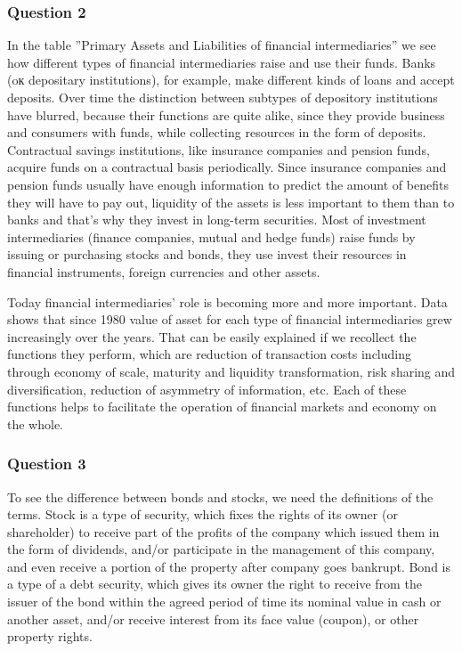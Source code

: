 \documentclass[a4paper,12pt]{article} %
\begin{document}
\subsubsection*{Question 2  }
In the table  ''Primary Assets and Liabilities of financial intermediaries''  we see how different types of financial intermediaries raise and use   their funds. Banks (oк depositary institutions), for example, make different kinds of loans and accept deposits. Over time the distinction between subtypes of depository institutions have blurred, because their functions are quite alike, since they provide business and consumers with funds, while collecting resources in the form of deposits.  Contractual savings institutions, like insurance companies and pension funds, acquire funds on a contractual basis periodically. Since insurance companies and pension funds  usually have enough information to predict the amount of benefits they will have to pay out, liquidity of the assets is less important to them than to banks and that's why they invest in long-term securities.  Most of investment intermediaries (finance companies, mutual and hedge funds) raise funds by issuing or purchasing  stocks and bonds, they use invest their resources in financial instruments, foreign currencies and other assets.   

 Today financial intermediaries' role is becoming  more and more important. Data shows that since 1980 value of asset for each type of financial intermediaries grew increasingly   over the  years. That can be easily explained if we recollect the functions they perform, which are  reduction of transaction costs including through economy of scale,  maturity and liquidity transformation, risk sharing and diversification, reduction of asymmetry of information, etc. Each of these functions helps to facilitate the operation of financial markets and economy on the whole. 

\subsubsection*{Question 3  }
To see the difference between bonds and stocks, we need the definitions of the terms. 
Stock is a type of security, which fixes  the rights of its owner (or shareholder) to receive part of the profits of the  company which issued them  in the form of dividends, and/or participate in the management of this company, and even  receive a portion of the property  after company  goes bankrupt.
Bond is a type of a debt security, which gives its owner the right to receive from the issuer of the bond  within the agreed period of time its nominal value in cash or  another asset, and/or receive interest  from its face value (coupon), or other property rights.
\end{document}
